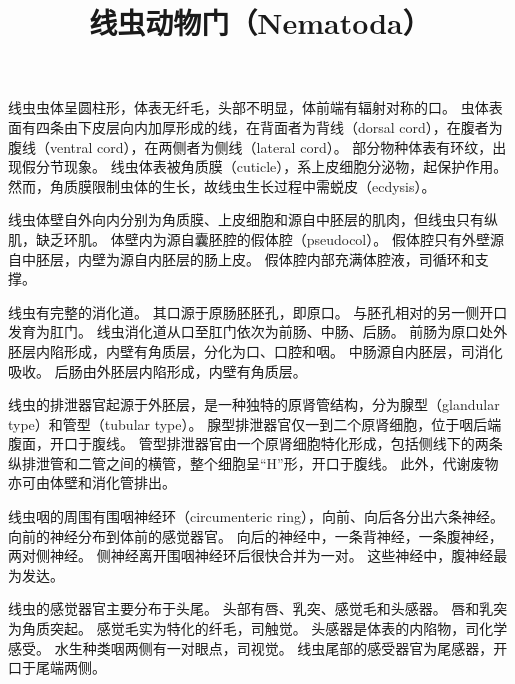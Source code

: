 \documentclass[11pt]{article}
\title{线虫动物门（Nematoda）}
\date{}
\begin{document}
  \maketitle

  \linenumbers
线虫虫体呈圆柱形，体表无纤毛，头部不明显，体前端有辐射对称的口。
虫体表面有四条由下皮层向内加厚形成的线，在背面者为背线（dorsal cord），在腹者为腹线（ventral cord），在两侧者为侧线（lateral cord）。
部分物种体表有环纹，出现假分节现象。
线虫体表被角质膜（cuticle），系上皮细胞分泌物，起保护作用。
然而，角质膜限制虫体的生长，故线虫生长过程中需蜕皮（ecdysis）。

\newline

线虫体壁自外向内分别为角质膜、上皮细胞和源自中胚层的肌肉，但线虫只有纵肌，缺乏环肌。
体壁内为源自囊胚腔的假体腔（pseudocol）。
假体腔只有外壁源自中胚层，内壁为源自内胚层的肠上皮。
假体腔内部充满体腔液，司循环和支撑。

\newline

线虫有完整的消化道。
其口源于原肠胚胚孔，即原口。
与胚孔相对的另一侧开口发育为肛门。
线虫消化道从口至肛门依次为前肠、中肠、后肠。
前肠为原口处外胚层内陷形成，内壁有角质层，分化为口、口腔和咽。
中肠源自内胚层，司消化吸收。
后肠由外胚层内陷形成，内壁有角质层。

\newline

线虫的排泄器官起源于外胚层，是一种独特的原肾管结构，分为腺型（glandular type）和管型（tubular type）。
腺型排泄器官仅一到二个原肾细胞，位于咽后端腹面，开口于腹线。
管型排泄器官由一个原肾细胞特化形成，包括侧线下的两条纵排泄管和二管之间的横管，整个细胞呈“H”形，开口于腹线。
此外，代谢废物亦可由体壁和消化管排出。

\newline

线虫咽的周围有围咽神经环（circumenteric ring），向前、向后各分出六条神经。
向前的神经分布到体前的感觉器官。
向后的神经中，一条背神经，一条腹神经，两对侧神经。
侧神经离开围咽神经环后很快合并为一对。
这些神经中，腹神经最为发达。

\newline

线虫的感觉器官主要分布于头尾。
头部有唇、乳突、感觉毛和头感器。
唇和乳突为角质突起。
感觉毛实为特化的纤毛，司触觉。
头感器是体表的内陷物，司化学感受。
水生种类咽两侧有一对眼点，司视觉。
线虫尾部的感受器官为尾感器，开口于尾端两侧。

\newline
\end{document}
